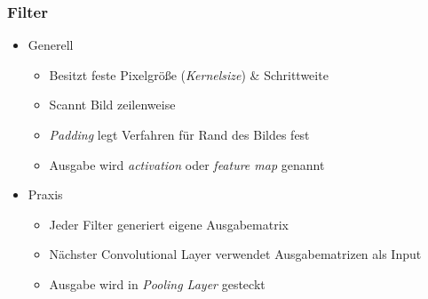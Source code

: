 \begin{frame}
\frametitle{Filter}


\begin{itemize}
\item Generell

\begin{itemize}
	\item Besitzt feste Pixelgröße (\emph{Kernelsize}) \& Schrittweite
	\item Scannt Bild zeilenweise
	\item \emph{Padding} legt Verfahren für Rand des Bildes fest
	\item Ausgabe wird \emph{activation} oder \emph{feature map} genannt
\end{itemize}

\item Praxis
\begin{itemize}
	\item Jeder Filter generiert eigene Ausgabematrix
	\item Nächster Convolutional Layer verwendet Ausgabematrizen als Input
	\item Ausgabe wird in \emph{Pooling Layer} gesteckt
\end{itemize}

\end{itemize}




\end{frame}


